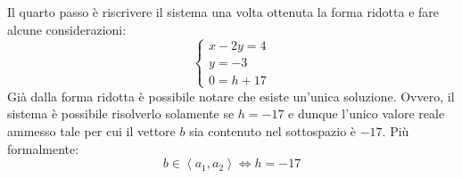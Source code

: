 \documentclass[a4paper]{article}
\begin{document}
	Il \textcolor{Red3}{quarto passo} è riscrivere il sistema una volta ottenuta la forma ridotta e fare alcune considerazioni:
	\begin{equation*}
		\begin{cases}
			x - 2y = 4  \\
			y = -3		\\
			0 = h + 17
		\end{cases}
	\end{equation*}
	Già dalla forma ridotta è possibile notare che esiste un'unica soluzione. Ovvero, il sistema è possibile risolverlo solamente se $h = -17$ e dunque l'unico valore reale ammesso tale per cui il vettore $b$ sia contenuto nel sottospazio è $-17$. Più formalmente:
	\begin{equation*}
		b \in \left\langle a_{1}, a_{2} \right\rangle \iff h = -17
	\end{equation*}
\end{document}
